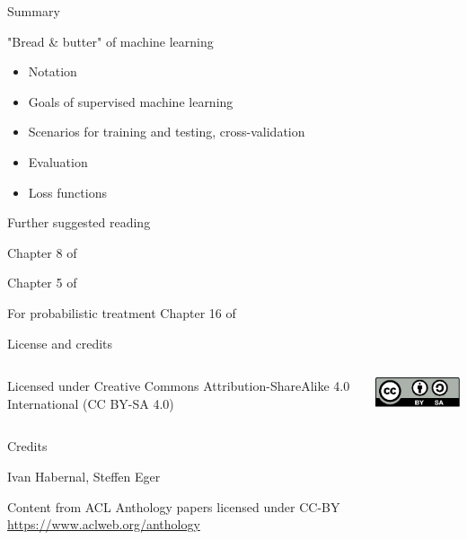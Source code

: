\documentclass[12pt]{beamer}
\begin{document}
\begin{frame}{Summary}
	
"Bread \& butter" of machine learning

\begin{itemize}
	\item Notation
	\item Goals of supervised machine learning
	\item Scenarios for training and testing, cross-validation
	\item Evaluation
	\item Loss functions
\end{itemize}

\end{frame}

\begin{frame}{Further suggested reading}

Chapter 8 of 

Chapter 5 of 

For probabilistic treatment Chapter 16 of 


\end{frame}

%  
%  

\begin{frame}{License and credits}
	
	\begin{columns}
		\begin{column}{0.7\textwidth}
			Licensed under Creative Commons Attribution-ShareAlike 4.0 International (CC BY-SA 4.0)
		\end{column}
		\begin{column}{0.2\textwidth}
			\includegraphics[width=0.9\linewidth]{img/cc-by-sa-icon.pdf}
		\end{column}
	\end{columns}
	
	\bigskip
	
	Credits
	
	\begin{scriptsize}
		
		Ivan Habernal, Steffen Eger
		
		Content from ACL Anthology papers licensed under CC-BY \url{https://www.aclweb.org/anthology}
		
	\end{scriptsize}
	
\end{frame}
\end{document}
